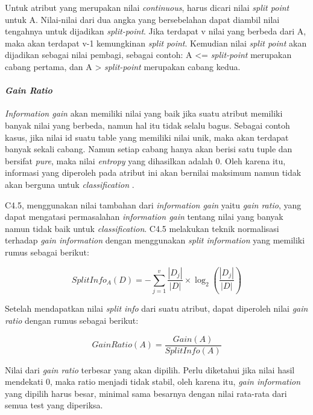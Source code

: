 Untuk atribut yang merupakan nilai \textsl{continuous}, harus dicari nilai \textsl{split point} untuk A. Nilai-nilai dari dua angka yang bersebelahan dapat diambil nilai tengahnya untuk dijadikan \textsl{split-point}. Jika terdapat v nilai yang berbeda dari A, maka akan terdapat v-1 kemungkinan \textsl{split point}. Kemudian nilai \textsl{split point} akan dijadikan sebagai nilai pembagi, sebagai contoh: A <= \textsl{split-point} merupakan cabang pertama, dan A > \textsl{split-point} merupakan cabang kedua.

\paragraph{\textsl{Gain Ratio}}

\textsl{Information gain} akan memiliki nilai yang baik jika suatu atribut memiliki banyak nilai yang berbeda, namun hal itu tidak selalu bagus. Sebagai contoh kasus, jika nilai id suatu table yang memiliki nilai unik, maka akan terdapat banyak sekali cabang. Namun setiap cabang hanya akan berisi satu tuple dan bersifat \textsl{pure}, maka nilai \textsl{entropy} yang dihasilkan adalah 0. Oleh karena itu, informasi yang diperoleh pada atribut ini akan bernilai maksimum namun tidak akan berguna untuk \textsl{classification} \cite{DM}.

C4.5, menggunakan nilai tambahan dari \textsl{information gain} yaitu \textsl{gain ratio}, yang dapat mengatasi permasalahan \textsl{information gain} tentang nilai yang banyak namun tidak baik untuk \textsl{classification}. C4.5 melakukan teknik normalisasi terhadap \textsl{gain information} dengan menggunakan \textsl{split information} yang memiliki rumus sebagai berikut:

\begin{displaymath}
	SplitInfo_A(D) = - \sum_{j=1}^v \frac{|D_j|}{|D|} \times \log_2 (\frac{|D_j|}{|D|})
\end{displaymath}

Setelah mendapatkan nilai \textsl{split info} dari suatu atribut, dapat diperoleh nilai \textsl{gain ratio} dengan rumus sebagai berikut:

\begin{displaymath}
	GainRatio(A) = \frac{Gain(A)}{SplitInfo(A)}
\end{displaymath}

Nilai dari \textsl{gain ratio} terbesar yang akan dipilih. Perlu diketahui \cite{DM} jika nilai hasil mendekati 0, maka ratio menjadi tidak stabil, oleh karena itu, \textsl{gain information} yang dipilih harus besar, minimal sama besarnya dengan nilai rata-rata dari semua test yang diperiksa.

